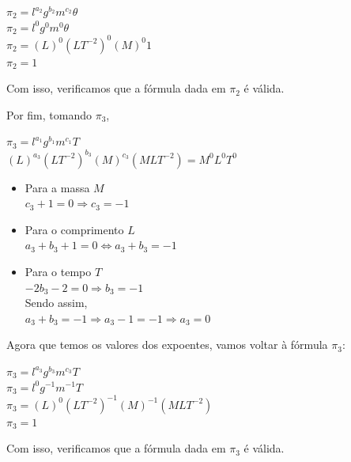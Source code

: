 \begin{center}
     $\pi_{2} = l^{a_2} g^{b_2} m^{c_2} \theta$ \\
      \vspace{0,2cm}
      $\pi_{2} = l^{0} g^{0} m^{0}\theta$ \\
       \vspace{0,2cm}
     $\pi_{2}=(L)^{0} (LT^{-2})^{0} (M)^{0} 1$ \\
     \vspace{0,2cm}
     $\pi_{2}=1$
\end{center}

Com isso, verificamos que a fórmula dada em $\pi_{2}$ é válida.

Por fim, tomando $\pi_{3}$, 
\begin{center}
    $\pi_{3} = l^{a_1} g^{b_1} m^{c_1} T$ \\
     \vspace{0,2cm}
     $(L)^{a_3} (LT^{-2})^{b_3} (M)^{c_3} (MLT^{-2}) = M^0 L^0 T^0$
\end{center}

\begin{itemize}
    \item Para a massa $M$ \\
    $c_{3}+1=0 \Rightarrow c_{3}=-1$
    \item Para o comprimento $L$ \\
    $a_{3}+b_{3}+1=0 \Leftrightarrow a_{3}+b_{3}=-1$
    \item Para o tempo $T$ \\
    $-2b_{3}-2=0 \Rightarrow b_{3}=-1$ \\
Sendo assim, \\
$a_{3}+b_{3}=-1 \Rightarrow a_{3}-1=-1 \Rightarrow a_{3}=0$
\end{itemize}

Agora que temos os valores dos expoentes, vamos voltar à fórmula $\pi_{3}$:

\begin{center}
     $\pi_{3} = l^{a_3} g^{b_3} m^{c_3} T$ \\
      \vspace{0,2cm}
      $\pi_{3} = l^{0} g^{-1} m^{-1} T$ \\
       \vspace{0,2cm}
     $\pi_{3}=(L)^{0} (LT^{-2})^{-1} (M)^{-1} (MLT^{-2})$ \\
     \vspace{0,2cm}
     $\pi_{3}=1$
\end{center}

Com isso, verificamos que a fórmula dada em $\pi_3$ é válida.